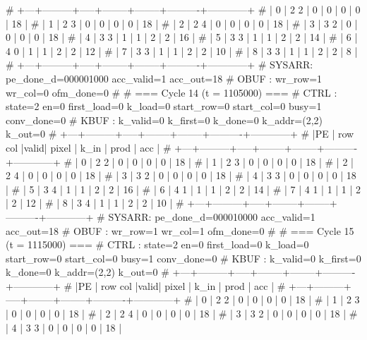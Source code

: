 # +---+---------+-----+--------+--------+----------+------------+
# | 0 |   2   2 |  0  |      0 |      0 |        0 |         18 |
# | 1 |   2   3 |  0  |      0 |      0 |        0 |         18 |
# | 2 |   2   4 |  0  |      0 |      0 |        0 |         18 |
# | 3 |   3   2 |  0  |      0 |      0 |        0 |         18 |
# | 4 |   3   3 |  1  |      1 |      2 |        2 |         16 |
# | 5 |   3   3 |  1  |      1 |      2 |        2 |         14 |
# | 6 |   4   0 |  1  |      1 |      2 |        2 |         12 |
# | 7 |   3   3 |  1  |      1 |      2 |        2 |         10 |
# | 8 |   3   3 |  1  |      1 |      2 |        2 |          8 |
# +---+---------+-----+--------+--------+----------+------------+
# SYSARR: pe_done_d=000001000 acc_valid=1 acc_out=18
# OBUF : wr_row=1 wr_col=0 ofm_done=0
# 
# === Cycle 14  (t = 1105000) ===
# CTRL : state=2 en=0 first_load=0 k_load=0 start_row=0 start_col=0 busy=1 conv_done=0
# KBUF : k_valid=0 k_first=0 k_done=0 k_addr=(2,2) k_out=0
# +---+---------+-----+--------+--------+----------+------------+
# |PE | row col |valid| pixel  |  k_in  |   prod   |    acc     |
# +---+---------+-----+--------+--------+----------+------------+
# | 0 |   2   2 |  0  |      0 |      0 |        0 |         18 |
# | 1 |   2   3 |  0  |      0 |      0 |        0 |         18 |
# | 2 |   2   4 |  0  |      0 |      0 |        0 |         18 |
# | 3 |   3   2 |  0  |      0 |      0 |        0 |         18 |
# | 4 |   3   3 |  0  |      0 |      0 |        0 |         18 |
# | 5 |   3   4 |  1  |      1 |      2 |        2 |         16 |
# | 6 |   4   1 |  1  |      1 |      2 |        2 |         14 |
# | 7 |   4   1 |  1  |      1 |      2 |        2 |         12 |
# | 8 |   3   4 |  1  |      1 |      2 |        2 |         10 |
# +---+---------+-----+--------+--------+----------+------------+
# SYSARR: pe_done_d=000010000 acc_valid=1 acc_out=18
# OBUF : wr_row=1 wr_col=1 ofm_done=0
# 
# === Cycle 15  (t = 1115000) ===
# CTRL : state=2 en=0 first_load=0 k_load=0 start_row=0 start_col=0 busy=1 conv_done=0
# KBUF : k_valid=0 k_first=0 k_done=0 k_addr=(2,2) k_out=0
# +---+---------+-----+--------+--------+----------+------------+
# |PE | row col |valid| pixel  |  k_in  |   prod   |    acc     |
# +---+---------+-----+--------+--------+----------+------------+
# | 0 |   2   2 |  0  |      0 |      0 |        0 |         18 |
# | 1 |   2   3 |  0  |      0 |      0 |        0 |         18 |
# | 2 |   2   4 |  0  |      0 |      0 |        0 |         18 |
# | 3 |   3   2 |  0  |      0 |      0 |        0 |         18 |
# | 4 |   3   3 |  0  |      0 |      0 |        0 |         18 |
